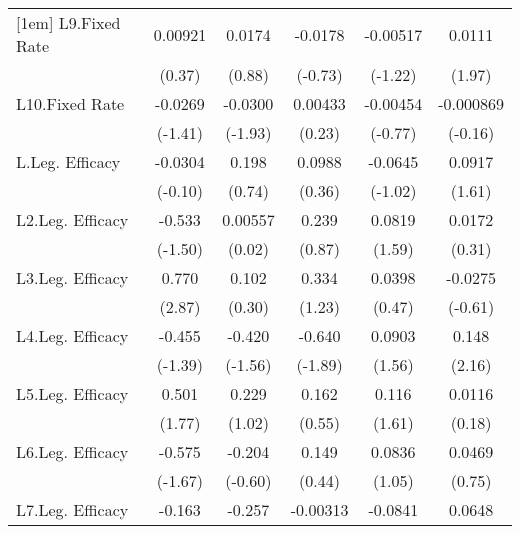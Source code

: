 {\begin{longtable}{l*{5}{c}}
[1em]
L9.Fixed Rate   &  0.00921         &   0.0174         &  -0.0178         & -0.00517         &   0.0111         \\
                &   (0.37)         &   (0.88)         &  (-0.73)         &  (-1.22)         &   (1.97)         \\
[1em]
L10.Fixed Rate  &  -0.0269         &  -0.0300         &  0.00433         & -0.00454         &-0.000869         \\
                &  (-1.41)         &  (-1.93)         &   (0.23)         &  (-0.77)         &  (-0.16)         \\
[1em]
L.Leg. Efficacy &  -0.0304         &    0.198         &   0.0988         &  -0.0645         &   0.0917         \\
                &  (-0.10)         &   (0.74)         &   (0.36)         &  (-1.02)         &   (1.61)         \\
[1em]
L2.Leg. Efficacy&   -0.533         &  0.00557         &    0.239         &   0.0819         &   0.0172         \\
                &  (-1.50)         &   (0.02)         &   (0.87)         &   (1.59)         &   (0.31)         \\
[1em]
L3.Leg. Efficacy&    0.770\sym{**} &    0.102         &    0.334         &   0.0398         &  -0.0275         \\
                &   (2.87)         &   (0.30)         &   (1.23)         &   (0.47)         &  (-0.61)         \\
[1em]
L4.Leg. Efficacy&   -0.455         &   -0.420         &   -0.640         &   0.0903         &    0.148\sym{*}  \\
                &  (-1.39)         &  (-1.56)         &  (-1.89)         &   (1.56)         &   (2.16)         \\
[1em]
L5.Leg. Efficacy&    0.501         &    0.229         &    0.162         &    0.116         &   0.0116         \\
                &   (1.77)         &   (1.02)         &   (0.55)         &   (1.61)         &   (0.18)         \\
[1em]
L6.Leg. Efficacy&   -0.575         &   -0.204         &    0.149         &   0.0836         &   0.0469         \\
                &  (-1.67)         &  (-0.60)         &   (0.44)         &   (1.05)         &   (0.75)         \\
[1em]
L7.Leg. Efficacy&   -0.163         &   -0.257         & -0.00313         &  -0.0841         &   0.0648         \\

\end{longtable}}
